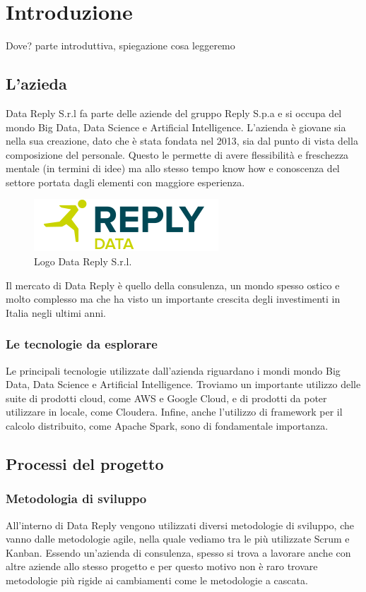 \chapter{Introduzione}
\label{Introduzione}
Dove?
parte introduttiva, spiegazione cosa leggeremo
\section{L'azieda}
Data Reply S.r.l fa parte delle aziende del gruppo Reply S.p.a e si occupa del mondo Big Data, Data Science e Artificial Intelligence. L'azienda è giovane sia nella sua creazione, dato che è stata fondata nel 2013, sia dal punto di vista della composizione del personale. Questo le permette di avere flessibilità e freschezza mentale (in termini di idee) ma allo stesso tempo know how e conoscenza del settore portata dagli elementi con maggiore esperienza.

\begin{figure}
	\centering
	\includegraphics[scale=2]{figures/data-reply-logo}
	\caption[Short figure name.]{Logo Data Reply S.r.l.
		\label{fig:logoDataReply}}
\end{figure}

Il mercato di Data Reply è quello della consulenza, un mondo spesso ostico e molto complesso ma che ha visto un importante crescita degli investimenti in Italia negli ultimi anni.
\subsection{Le tecnologie da esplorare}
Le principali tecnologie utilizzate dall'azienda riguardano i mondi mondo Big Data, Data Science e Artificial Intelligence. Troviamo un importante utilizzo delle suite di prodotti cloud, come \gls{AWS} e \gls{Google Cloud}, e di prodotti da poter utilizzare in locale, come \gls{Cloudera}. Infine, anche l'utilizzo di framework per il calcolo distribuito, come \gls{Apache Spark}, sono di fondamentale importanza.
\section{Processi del progetto}
\subsection{Metodologia di sviluppo}
All'interno di Data Reply vengono utilizzati diversi metodologie di sviluppo, che vanno dalle metodologie agile, nella quale vediamo tra le più utilizzate \gls{Scrum} e \gls{Kanban}. Essendo un'azienda di consulenza, spesso si trova a lavorare anche con altre aziende allo stesso progetto e per questo motivo non è raro trovare metodologie più rigide ai cambiamenti come le metodologie a cascata.

